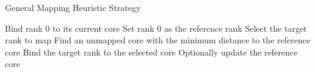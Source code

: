 
\begin{algorithm}
    \caption{General Mapping Heuristic Strategy}
    \label{alg:toporr-strat}
    \DontPrintSemicolon

         Bind rank 0 to its current core \;
         Set rank 0 as the reference rank \;
         {
             Select the target rank to map \;
             Find an unmapped core with the minimum distance to the reference core   \;
             Bind the target rank to the selected core \;
             Optionally update the reference core \;
        }
\end{algorithm}